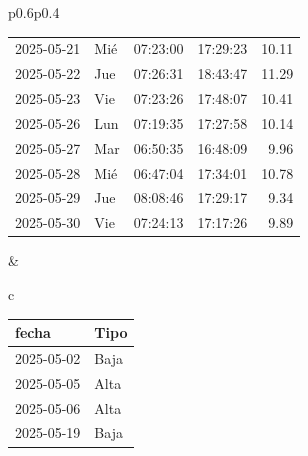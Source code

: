 \documentclass[11pt,a4paper]{article}
\newcommand{\infobox}[2]{
  \begin{tcolorbox}[
    colback=grisclaro,
    colframe=corporativo,
    title=#1,
    fonttitle=\bfseries
  ]
#2
  \end{tcolorbox}
}
\begin{document}
\begin{tabular}{p{}p{}}
{\begin{tabular}{p{2cm} p{0.6cm} p{1.2cm} p{1.2cm} r}
2025-05-21 & Mié & 07:23:00 & 17:29:23 &10.11\\
\rowcolor{white}%
2025-05-22 & Jue & 07:26:31 & 18:43:47 &11.29\\
\rowcolor{white}%
2025-05-23 & Vie & 07:23:26 & 17:48:07 &10.41\\
\rowcolor{white}%
2025-05-26 & Lun & 07:19:35 & 17:27:58 &10.14\\
\rowcolor{white}%
2025-05-27 & Mar & 06:50:35 & 16:48:09 &9.96\\
\rowcolor{white}%
2025-05-28 & Mié & 06:47:04 & 17:34:01 &10.78\\
\rowcolor{white}%
2025-05-29 & Jue & 08:08:46 & 17:29:17 &9.34\\
\rowcolor{white}%
2025-05-30 & Vie & 07:24:13 & 17:17:26 &9.89\\

\bottomrule
\end{tabular}
}
&
\begin{tabular}{c}

\infobox{D\'ias At\'ipicos}{
\begin{tabular}{p{2cm} p{2cm}}
\toprule
\rowcolor{grisclaro} \textbf{fecha} & \textbf{Tipo}\\
\midrule

2025-05-02 & Baja\\

2025-05-05 & Alta\\

2025-05-06 & Alta\\

2025-05-19 & Baja\\

\bottomrule
\end{tabular}
}
\\
\\




    

    

    

    

    

    

    


\end{tabular}
\end{tabular}
\end{document}
